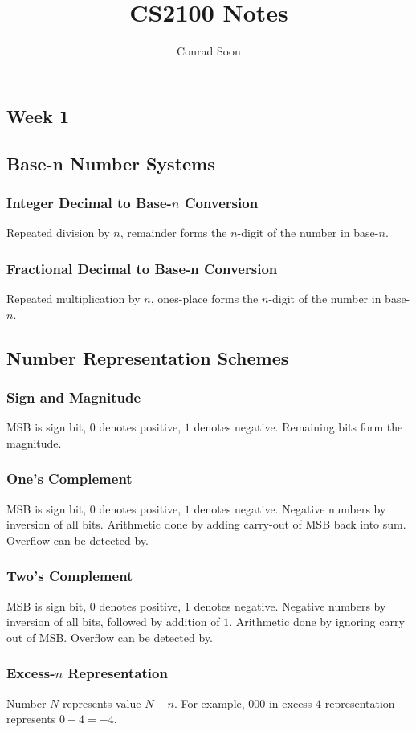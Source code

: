 \documentclass{article}
\title{CS2100 Notes}
\author{Conrad Soon}
\begin{document}
\begin{multicols*}{3}
\maketitle
\section{Week 1}
\subsection{Base-n Number Systems}
\subsubsection{Integer Decimal to Base-$n$ Conversion}
Repeated division by $n$, remainder forms the $n$-digit of the number in base-$n$.
\subsubsection{Fractional Decimal to Base-n Conversion}
Repeated multiplication by $n$, ones-place forms the $n$-digit of the number in base-$n$.
\subsection{Number Representation Schemes}
\subsubsection{Sign and Magnitude}
MSB is sign bit, $0$ denotes positive, $1$ denotes negative. Remaining bits form the magnitude.
\subsubsection{One's Complement}
MSB is sign bit, $0$ denotes positive, $1$ denotes negative.
Negative numbers by inversion of all bits.
Arithmetic done by adding carry-out of MSB back into sum.
Overflow can be detected by.
\subsubsection{Two's Complement}
MSB is sign bit, $0$ denotes positive, $1$ denotes negative.
Negative numbers by inversion of all bits, followed by addition of $1$.
Arithmetic done by ignoring carry out of MSB.
Overflow can be detected by.
\subsubsection{Excess-$n$ Representation}
Number $N$ represents value $N-n$. For example, $000$ in excess-$4$ representation represents $0-4=-4$.


\end{multicols*}
\end{document}
